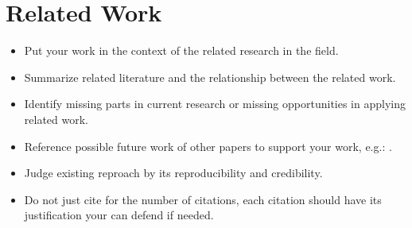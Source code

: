 \section{Related Work}

\begin{itemize}
	\item Put your work in the context of the related research in the field.
	\item Summarize related literature and the relationship between the related work.
	\item Identify missing parts in current research or missing opportunities in applying related work.
	\item Reference possible future work of other papers to support your work, e.g.: \cite{bruegge2009object}.
	\item Judge existing reproach by its reproducibility and credibility.
	\item Do not just cite for the number of citations, each citation should have its justification your can defend if needed.
\end{itemize}